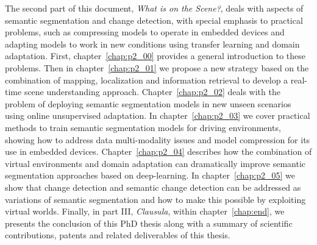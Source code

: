 The second part of this document, \textit{What is on the Scene?}, deals with aspects of semantic segmentation and change detection, with special emphasis to practical problems, such as compressing models to operate in embedded devices and adapting models to work in new conditions using transfer learning and domain adaptation. First, chapter~\ref{chap:p2_00} provides a general  introduction to these problems. Then in chapter~\ref{chap:p2_01} we propose a new strategy  based on the combination of mapping, localization and information retrieval to develop a real-time scene understanding approach. Chapter~\ref{chap:p2_02} deals with the problem of deploying semantic segmentation models in new unseen scenarios using online unsupervised adaptation. In chapter~\ref{chap:p2_03} we cover practical methods to train semantic segmentation models for driving environments, showing how to address data multi-modality issues and model compression for its use in embedded devices. Chapter~\ref{chap:p2_04} describes how the combination of virtual environments and domain adaptation can dramatically improve semantic segmentation approaches based on deep-learning. In chapter~\ref{chap:p2_05} we show that change detection and semantic change detection can be addressed as variations of semantic segmentation and how to make this possible by exploiting virtual worlds. Finally, in part III, \textit{Clausula}, within chapter~\ref{chap:end}, we presents the conclusion of this PhD thesis along with a summary of scientific contributions, patents and related deliverables of this thesis.